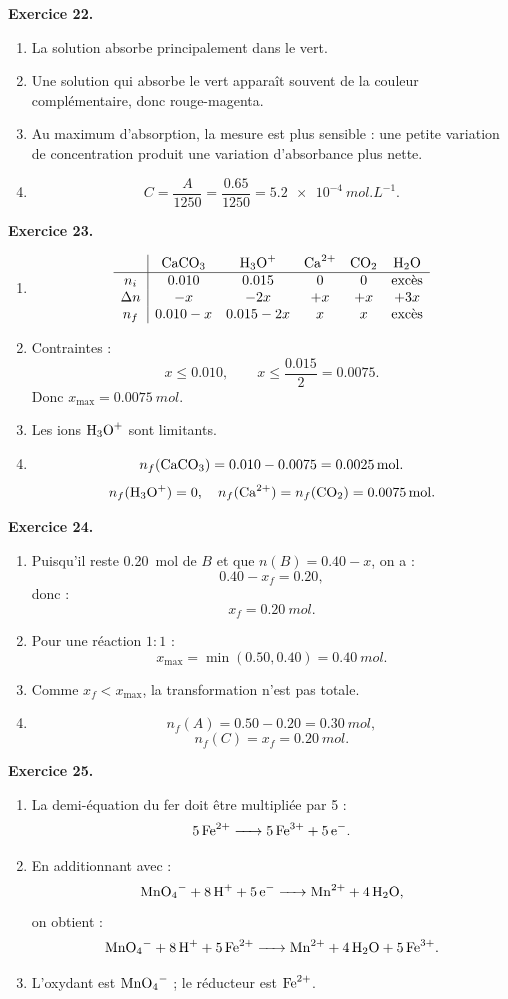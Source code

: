 \documentclass[11pt,a4paper]{article}
\newcommand{\corr}[2]{
  \begin{correctionbox}
  \textbf{Exercice #1.} #2
  \end{correctionbox}
}
\begin{document}
\corr{22}{
\begin{enumerate}
  \item La solution absorbe principalement dans le vert.
  \item Une solution qui absorbe le vert apparaît souvent de la couleur complémentaire, donc rouge-magenta.
  \item Au maximum d'absorption, la mesure est plus sensible : une petite variation de concentration produit une variation d'absorbance plus nette.
  \item
  \[
  C=\frac{A}{1250}=\frac{0.65}{1250}=\SI{5.2e-4}{mol.L^{-1}}.
  \]
\end{enumerate}
}

\corr{23}{
\begin{enumerate}
  \item
  \[
  \begin{array}{c|ccccc}
  & \ce{CaCO3} & \ce{H3O+} & \ce{Ca^{2+}} & \ce{CO2} & \ce{H2O}\\
  \hline
  n_i & 0.010 & 0.015 & 0 & 0 & \text{excès}\\
  \Delta n & -x & -2x & +x & +x & +3x\\
  n_f & 0.010-x & 0.015-2x & x & x & \text{excès}
  \end{array}
  \]
  \item Contraintes :
  \[
  x\leq 0.010,\qquad x\leq \frac{0.015}{2}=0.0075.
  \]
  Donc $x_{\max}=\SI{0.0075}{mol}$.
  \item Les ions $\ce{H3O+}$ sont limitants.
  \item
  \[
  n_f(\ce{CaCO3})=0.010-0.0075=\SI{0.0025}{mol}.
  \]
  \[
  n_f(\ce{H3O+})=0,\quad n_f(\ce{Ca^{2+}})=n_f(\ce{CO2})=\SI{0.0075}{mol}.
  \]
\end{enumerate}
}

\corr{24}{
\begin{enumerate}
  \item Puisqu'il reste \SI{0.20}{mol} de $B$ et que $n(B)=0.40-x$, on a :
  \[
  0.40-x_f=0.20,
  \]
  donc :
  \[
  x_f=\SI{0.20}{mol}.
  \]
  \item Pour une réaction $1:1$ :
  \[
  x_{\max}=\min(0.50,0.40)=\SI{0.40}{mol}.
  \]
  \item Comme $x_f<x_{\max}$, la transformation n'est pas totale.
  \item
  \[
  n_f(A)=0.50-0.20=\SI{0.30}{mol},
  \]
  \[
  n_f(C)=x_f=\SI{0.20}{mol}.
  \]
\end{enumerate}
}

\corr{25}{
\begin{enumerate}
  \item La demi-équation du fer doit être multipliée par 5 :
  \[
  \ce{5Fe^{2+} -> 5Fe^{3+} + 5e-}.
  \]
  \item En additionnant avec :
  \[
  \ce{MnO4- + 8H+ + 5e- -> Mn^{2+} + 4H2O},
  \]
  on obtient :
  \[
  \ce{MnO4- + 8H+ + 5Fe^{2+} -> Mn^{2+} + 4H2O + 5Fe^{3+}}.
  \]
  \item L'oxydant est $\ce{MnO4-}$ ; le réducteur est $\ce{Fe^{2+}}$.
\end{enumerate}
}
\end{document}
